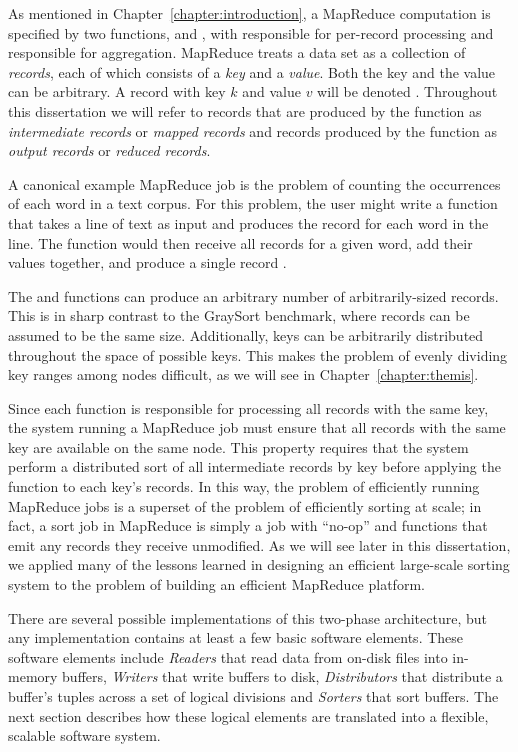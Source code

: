 As mentioned in Chapter~\ref{chapter:introduction}, a MapReduce computation is
specified by two functions, \map and \reduce, with \map responsible for
per-record processing and \reduce responsible for aggregation. MapReduce treats
a data set as a collection of \emph{records}, each of which consists of a
\emph{key} and a \emph{value}. Both the key and the value can be arbitrary. A
record with key $k$ and value $v$ will be denoted .  Throughout
this dissertation we will refer to records that are produced by the \map
function as \emph{intermediate records} or \emph{mapped records} and records
produced by the \reduce function as \emph{output records} or \emph{reduced
  records}.

A canonical example MapReduce job is the problem of counting the occurrences of
each word in a text corpus. For this problem, the user might write a \map
function that takes a line of text as input and produces the record
 for each word in the line. The \reduce function would then
receive all records for a given word, add their values together, and produce a
single record .

The \map and \reduce functions can produce an arbitrary number of
arbitrarily-sized records. This is in sharp contrast to the GraySort benchmark,
where records can be assumed to be the same size. Additionally, keys can be
arbitrarily distributed throughout the space of possible keys. This makes the
problem of evenly dividing key ranges among nodes difficult, as we will see in
Chapter~\ref{chapter:themis}.

Since each \reduce function is responsible for processing all records with the
same key, the system running a MapReduce job must ensure that all records with
the same key are available on the same node. This property requires that the
system perform a distributed sort of all intermediate records by key before
applying the \reduce function to each key's records. In this way, the problem
of efficiently running MapReduce jobs is a superset of the problem of
efficiently sorting at scale; in fact, a sort job in MapReduce is simply a job
with ``no-op'' \map and \reduce functions that emit any records they receive
unmodified. As we will see later in this dissertation, we applied many of the
lessons learned in designing an efficient large-scale sorting system to the
problem of building an efficient MapReduce platform.

There are several possible implementations of this two-phase architecture, but
any implementation contains at least a few basic software elements. These
software elements include {\em Readers} that read data from on-disk files into
in-memory buffers, {\em Writers} that write buffers to disk, {\em Distributors}
that distribute a buffer's tuples across a set of logical divisions and {\em
  Sorters} that sort buffers. The next section describes how these logical
elements are translated into a flexible, scalable software system.
